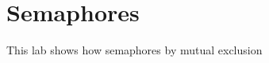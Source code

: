 \hypertarget{index_Semaphores}{}\section{Semaphores}\label{index_Semaphores}
This lab shows how semaphores by mutual exclusion 